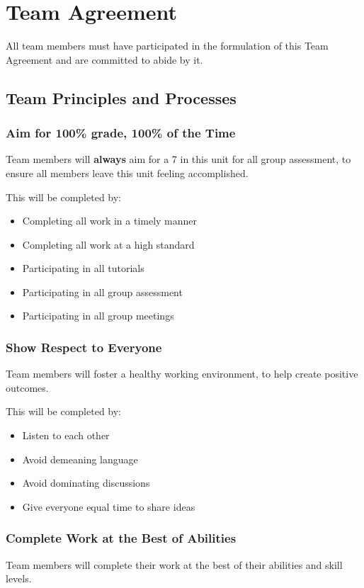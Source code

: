\documentclass[12pt, a4paper, onecolumn]{article}
\begin{document}
\newpage
\section{Team Agreement}
All team members must have participated in the formulation of
this Team Agreement and are committed to abide by it.

\subsection{Team Principles and Processes}

\subsubsection{Aim for 100\% grade, 100\% of the Time}
Team members will \textbf{always} aim for a 7 in this unit for all group
assessment, to ensure all members leave this unit feeling accomplished.

This will be completed by:
\begin{itemize}
  \setlength\itemsep{1px}
  \item Completing all work in a timely manner
  \item Completing all work at a high standard
  \item Participating in all tutorials
  \item Participating in all group assessment
  \item Participating in all group meetings
\end{itemize}

\subsubsection{Show Respect to Everyone}
Team members will foster a healthy working environment, to help
create positive outcomes.

This will be completed by:
\begin{itemize}
  \setlength\itemsep{1px}
  \item Listen to each other
  \item Avoid demeaning language
  \item Avoid dominating discussions
  \item Give everyone equal time to share ideas
\end{itemize}

\subsubsection{Complete Work at the Best of Abilities}
Team members will complete their work at the best of their abilities
and skill levels.
\end{document}
